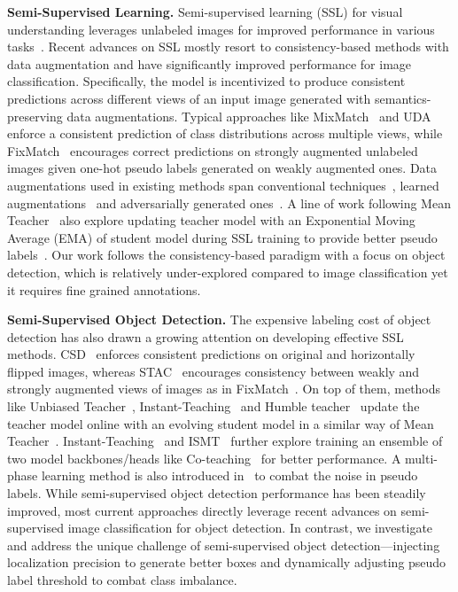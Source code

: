 \documentclass[letterpaper]{article} \usepackage{aaai22}  \usepackage{times}  \usepackage{helvet}  \usepackage{courier}  \usepackage[hyphens]{url}  \usepackage{graphicx} \urlstyle{rm} \def\UrlFont{\rm}  \usepackage{natbib}  \usepackage{caption} \DeclareCaptionStyle{ruled}{labelfont=normalfont,labelsep=colon,strut=off} \frenchspacing  \setlength{\pdfpagewidth}{8.5in}  \setlength{\pdfpageheight}{11in}  \usepackage{algorithm}
\begin{document}
\noindent\textbf{Semi-Supervised Learning.} Semi-supervised learning (SSL) for visual understanding leverages unlabeled images for improved performance in various tasks~\cite{berthelot2019mixmatch,uda,sohn2020fixmatch,miyato2018virtual,bachman2014learning,xie2020self,laine2016temporal}. Recent advances on SSL mostly resort to consistency-based methods with data augmentation and have significantly improved performance for image classification. Specifically, the model is incentivized to produce consistent predictions across different views of an input image generated with semantics-preserving data augmentations. Typical approaches like MixMatch~\citeyearpar{berthelot2019mixmatch} and UDA~\citeyearpar{uda} enforce a consistent prediction of class distributions across multiple views, while FixMatch~\citeyearpar{sohn2020fixmatch} encourages correct predictions on strongly augmented unlabeled images given one-hot pseudo labels generated on weakly augmented ones. Data augmentations used in existing methods span conventional techniques~\cite{cutout,zhang2017mixup}, learned augmentations~\cite{cubuk2018autoaugment,cubuk2020randaugment} and adversarially generated ones~\cite{miyato2018virtual}. A line of work following Mean Teacher~\citeyearpar{meanteacher} also explore updating teacher model with an Exponential Moving Average (EMA) of student model during SSL training to provide better pseudo labels~\cite{sohn2020fixmatch,cai2021exponential}. Our work follows the consistency-based paradigm with a focus on object detection, which is relatively under-explored compared to image classification yet it requires fine grained annotations.

\noindent\textbf{Semi-Supervised Object Detection.} 
The expensive labeling cost of object detection has also drawn a growing attention on developing effective SSL methods. CSD~\citeyearpar{csd} enforces consistent predictions on original and horizontally flipped images, whereas STAC~\citeyearpar{stac} encourages consistency between weakly and strongly augmented views of images as in FixMatch~\citeyearpar{sohn2020fixmatch}. On top of them, methods like Unbiased Teacher~\citeyearpar{unbiasedteacher}, Instant-Teaching~\citeyearpar{instantteaching} and Humble teacher~\citeyearpar{tang2021humble} update the teacher model online with an evolving student model in a similar way of Mean Teacher~\citeyearpar{meanteacher}. Instant-Teaching~\citeyearpar{instantteaching} and ISMT~\citeyearpar{ismt} further explore training an ensemble of two model backbones/heads like Co-teaching~\citeyearpar{coteaching} for better performance. A multi-phase learning method is also introduced in~\citeyearpar{multiphaselearning} to combat the noise in pseudo labels. 
While semi-supervised object detection performance has been steadily improved, most current approaches directly leverage recent advances on semi-supervised image classification for object detection. In contrast, we investigate and address the unique challenge of semi-supervised object detection---injecting localization precision to generate better boxes and dynamically adjusting pseudo label threshold to combat class imbalance.
\end{document}
